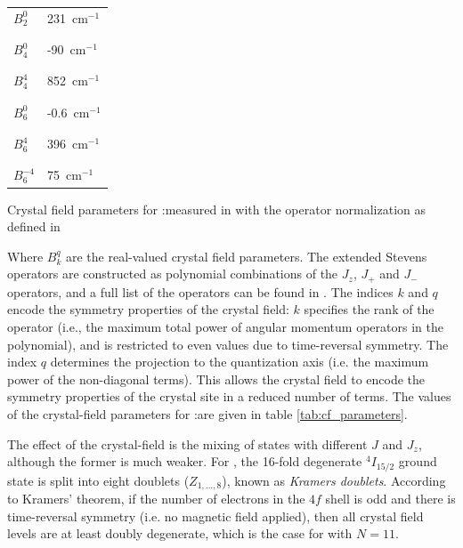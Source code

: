 \begin{margintable}
\centering
\begin{tabular}{l|l}
$B_2^0$    & 231~cm$^{-1}$  \\[-1em] \\ \hline \\[-1em]
$B_4^0$    & -90~cm$^{-1}$  \\[-1em] \\ \hline \\[-1em]
$B_4^4$    & 852~cm$^{-1}$  \\[-1em] \\ \hline \\[-1em]
$B_6^0$    & -0.6~cm$^{-1}$ \\[-1em] \\ \hline \\[-1em]
$B_6^4$    & 396~cm$^{-1}$  \\[-1em] \\ \hline \\[-1em]
$B_6^{-4}$ & 75~cm$^{-1}$  
\end{tabular}
\caption[Crystal field parameters]{Crystal field parameters for \Er:\Ca measured in \cite{enrique_optical_1971} with the operator normalization as defined in \cite{erath_crystal_1961}}
\label{tab:cf_parameters}
\end{margintable}

Where $B_k^q$ are the real-valued crystal field parameters. The extended Stevens operators are constructed as polynomial combinations of the $J_z$, $J_+$ and $J_-$ operators, and a full list of the operators can be found in . The indices $k$ and $q$ encode the symmetry properties of the crystal field: $k$ specifies the rank of the operator (i.e., the maximum total power of angular momentum operators in the polynomial), and is restricted to even values due to time-reversal symmetry. The index $q$ determines the projection to the quantization axis (i.e. the maximum power of the non-diagonal terms). This allows the crystal field to encode the symmetry properties of the crystal site in a reduced number of terms. The values of the crystal-field parameters for \Er:\Ca are given in table \ref{tab:cf_parameters}. 

The effect of the crystal-field is the mixing of states with different $J$ and $J_z$, although the former is much weaker. For \Er, the 16-fold degenerate $^4I_{15/2}$ ground state is split into eight doublets ($Z_{1,\dots,8}$), known as \emph{Kramers doublets}. According to Kramers' theorem,  if the number of electrons in the $4f$ shell is odd and there is time-reversal symmetry (i.e. no magnetic field applied), then all crystal field levels are at least doubly degenerate, which is the case for \Er with $N=11$.

